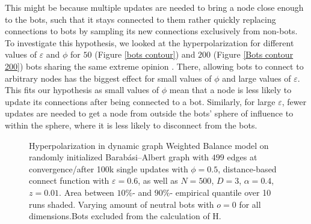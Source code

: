 \documentclass[11pt]{article}
\begin{document}
This might be because multiple updates are needed to bring a node close enough to the bots, such that it stays connected to them rather quickly replacing connections to bots by sampling its new connections exclusively from non-bots. To investigate this hypothesis, we looked at the hyperpolarization for different values of $\varepsilon$ and $\phi$ for $50$ (Figure \ref{bots contour}) and $200$ (Figure \ref{Bots contour 200}) bots sharing the same extreme opinion . There, allowing bots to connect to arbitrary nodes has the biggest effect for small values of $\phi$ and large values of $\varepsilon$. This fits our hypothesis as small values of $\phi$ mean that a node is less likely to update its connections after being connected to a bot. Similarly, for large $\varepsilon$, fewer updates are needed to get a node from outside the bots' sphere of influence to within the sphere, where it is less likely to disconnect from the bots. 

\begin{figure}[htb]
\caption{Hyperpolarization in dynamic graph Weighted Balance model on randomly initialized Barabási–Albert graph with $499$ edges at convergence/after 100k single updates with $\phi=0.5$, distance-based connect function with $\varepsilon=0.6$, as well as $N=500$, $D=3$, $\alpha=0.4$, $z=0.01$. Area between $10\%$- and $90\%$- empirical quantile over 10 runs shaded. Varying amount of neutral bots with $o=0$ for all dimensions.Bots excluded from the calculation of H.}
\label{bots dynamic_neutral}
\end{figure}
\end{document}
